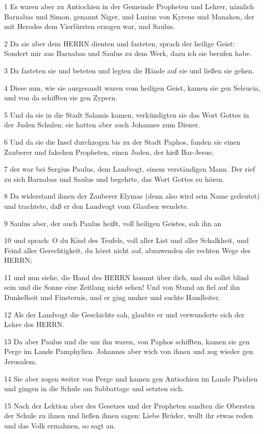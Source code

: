 \par 1 Es waren aber zu Antiochien in der Gemeinde Propheten und Lehrer, nämlich Barnabas und Simon, genannt Niger, und Luzius von Kyrene und Manahen, der mit Herodes dem Vierfürsten erzogen war, und Saulus.
\par 2 Da sie aber dem HERRN dienten und fasteten, sprach der heilige Geist: Sondert mir aus Barnabas und Saulus zu dem Werk, dazu ich sie berufen habe.
\par 3 Da fasteten sie und beteten und legten die Hände auf sie und ließen sie gehen.
\par 4 Diese nun, wie sie ausgesandt waren vom heiligen Geist, kamen sie gen Seleucia, und von da schifften sie gen Zypern.
\par 5 Und da sie in die Stadt Salamis kamen, verkündigten sie das Wort Gottes in der Juden Schulen; sie hatten aber auch Johannes zum Diener.
\par 6 Und da sie die Insel durchzogen bis zu der Stadt Paphos, fanden sie einen Zauberer und falschen Propheten, einen Juden, der hieß Bar-Jesus;
\par 7 der war bei Sergius Paulus, dem Landvogt, einem verständigen Mann. Der rief zu sich Barnabas und Saulus und begehrte, das Wort Gottes zu hören.
\par 8 Da widerstand ihnen der Zauberer Elymas (denn also wird sein Name gedeutet) und trachtete, daß er den Landvogt vom Glauben wendete.
\par 9 Saulus aber, der auch Paulus heißt, voll heiligen Geistes, sah ihn an
\par 10 und sprach: O du Kind des Teufels, voll aller List und aller Schalkheit, und Feind aller Gerechtigkeit, du hörst nicht auf, abzuwenden die rechten Wege des HERRN;
\par 11 und nun siehe, die Hand des HERRN kommt über dich, und du sollst blind sein und die Sonne eine Zeitlang nicht sehen! Und von Stund an fiel auf ihn Dunkelheit und Finsternis, und er ging umher und suchte Handleiter.
\par 12 Als der Landvogt die Geschichte sah, glaubte er und verwunderte sich der Lehre des HERRN.
\par 13 Da aber Paulus und die um ihn waren, von Paphos schifften, kamen sie gen Perge im Lande Pamphylien. Johannes aber wich von ihnen und zog wieder gen Jerusalem.
\par 14 Sie aber zogen weiter von Perge und kamen gen Antiochien im Lande Pisidien und gingen in die Schule am Sabbattage und setzten sich.
\par 15 Nach der Lektion aber des Gesetzes und der Propheten sandten die Obersten der Schule zu ihnen und ließen ihnen sagen: Liebe Brüder, wollt ihr etwas reden und das Volk ermahnen, so sagt an.
